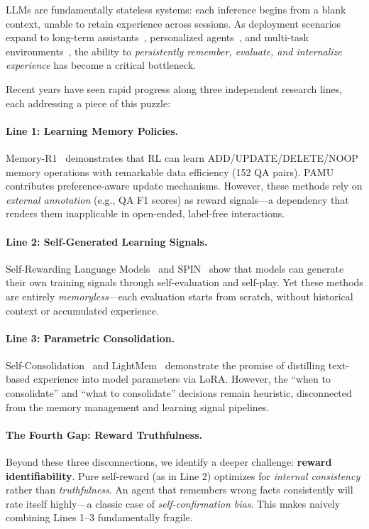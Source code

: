 \documentclass{article}
\begin{document}
LLMs are fundamentally stateless systems: each inference begins from a blank context, unable to retain experience across sessions. As deployment scenarios expand to long-term assistants~\citep{park2023generative}, personalized agents~\citep{chhikara2025mem0}, and multi-task environments~\citep{evolver2025}, the ability to \emph{persistently remember, evaluate, and internalize experience} has become a critical bottleneck.

Recent years have seen rapid progress along three independent research lines, each addressing a piece of this puzzle:

\paragraph{Line 1: Learning Memory Policies.}
Memory-R1~\citep{chen2025memoryr1} demonstrates that RL can learn ADD/UPDATE/DELETE/NOOP memory operations with remarkable data efficiency (152 QA pairs). PAMU~\citep{wang2025pamu} contributes preference-aware update mechanisms. However, these methods rely on \emph{external annotation} (e.g., QA F1 scores) as reward signals---a dependency that renders them inapplicable in open-ended, label-free interactions.

\paragraph{Line 2: Self-Generated Learning Signals.}
Self-Rewarding Language Models~\citep{yuan2024selfrewarding} and SPIN~\citep{chen2024spin} show that models can generate their own training signals through self-evaluation and self-play. Yet these methods are entirely \emph{memoryless}---each evaluation starts from scratch, without historical context or accumulated experience.

\paragraph{Line 3: Parametric Consolidation.}
Self-Consolidation~\citep{zhang2026selfconsolidation} and LightMem~\citep{lightmem2025} demonstrate the promise of distilling text-based experience into model parameters via LoRA. However, the ``when to consolidate'' and ``what to consolidate'' decisions remain heuristic, disconnected from the memory management and learning signal pipelines.

\paragraph{The Fourth Gap: Reward Truthfulness.}
Beyond these three disconnections, we identify a deeper challenge: \textbf{reward identifiability}. Pure self-reward (as in Line 2) optimizes for \emph{internal consistency} rather than \emph{truthfulness}. An agent that remembers wrong facts consistently will rate itself highly---a classic case of \emph{self-confirmation bias}. This makes naively combining Lines 1--3 fundamentally fragile.
\end{document}
